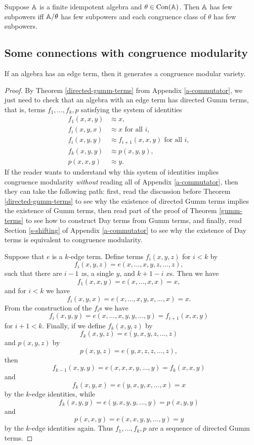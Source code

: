\documentclass[letterpaper,11pt]{article}
\DeclareMathOperator{\Con}{Con}
\begin{document}
\begin{cor} Suppose $\mathbb{A}$ is a finite idempotent algebra and $\theta \in \Con(\bA)$. Then $\mathbb{A}$ has few subpowers iff $\mathbb{A}/\theta$ has few subpowers and each congruence class of $\theta$ has few subpowers.
\end{cor}


\subsection{Some connections with congruence modularity}

\begin{thm} If an algebra has an edge term, then it generates a congruence modular variety.
\end{thm}
\begin{proof} By Theorem \ref{directed-gumm-terms} from Appendix \ref{a-commutator}, we just need to check that an algebra with an edge term has directed Gumm terms, that is, terms $f_1, ..., f_k, p$ satisfying the system of identities
\begin{align*}
f_1(x,x,y) &\approx x,\\
f_i(x,y,x) &\approx x\text{ for all }i,\\
f_i(x,y,y) &\approx f_{i+1}(x,x,y)\text{ for all }i,\\
f_k(x,y,y) &\approx p(x,y,y),\\
p(x,x,y) &\approx y.
\end{align*}
If the reader wants to understand why this system of identities implies congruence modularity \emph{without} reading all of Appendix \ref{a-commutator}, then they can take the following path: first, read the discussion before Theorem \ref{directed-gumm-terms} to see why the existence of directed Gumm terms implies the existence of Gumm terms, then read part of the proof of Theorem \ref{gumm-terms} to see how to construct Day terms from Gumm terms, and finally, read Section \ref{s-shifting} of Appendix \ref{a-commutator} to see why the existence of Day terms is equivalent to congruence modularity.

Suppose that $e$ is a $k$-edge term. Define terms $f_i(x,y,z)$ for $i < k$ by
\[
f_i(x,y,z) = e(x,...,x,y,z,...,z),
\]
such that there are $i-1$ $z$s, a single $y$, and $k+1-i$ $x$s. Then we have
\[
f_1(x,x,y) = e(x,...,x,x) = x,
\]
and for $i < k$ we have
\[
f_i(x,y,x) = e(x,...,x,y,x,...,x) = x.
\]
From the construction of the $f_i$s we have
\[
f_i(x,y,y) = e(x,...,x,y,y,...,y) = f_{i+1}(x,x,y)
\]
for $i+1 < k$. Finally, if we define $f_k(x,y,z)$ by
\[
f_k(x,y,z) = e(y,x,y,z,...,z)
\]
and $p(x,y,z)$ by
\[
p(x,y,z) = e(y,x,z,z,...,z),
\]
then
\[
f_{k-1}(x,y,y) = e(x,x,x,y,...,y) = f_k(x,x,y)
\]
and
\[
f_k(x,y,x) = e(y,x,y,x,...,x) = x
\]
by the $k$-edge identities, while
\[
f_k(x,y,y) = e(y,x,y,y,...,y) = p(x,y,y)
\]
and
\[
p(x,x,y) = e(x,x,y,y,...,y) = y
\]
by the $k$-edge identities again. Thus $f_1, ..., f_k, p$ are a sequence of directed Gumm terms.
\end{proof}
\end{document}
